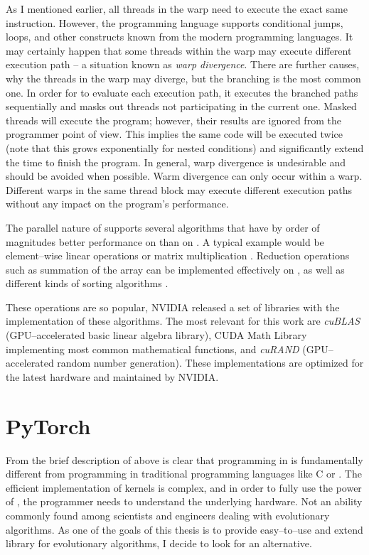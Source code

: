 As I mentioned earlier, all threads in the warp need to execute the exact same instruction. However, the programming language supports conditional jumps, loops, and other constructs known from the modern programming languages. It may certainly happen that some threads within the warp may execute different execution path -- a situation known as \emph{warp divergence}. There are further causes, why the threads in the warp may diverge, but the branching is the most common one. In order for \gpu to evaluate each execution path, it executes the branched paths sequentially and masks out threads not participating in the current one. Masked threads will execute the program; however, their results are ignored from the programmer point of view. This implies the same code will be executed twice (note that this grows exponentially for nested conditions) and significantly extend the time to finish the program. In general, warp divergence is undesirable and should be avoided when possible.
Warm divergence can only occur within a warp. Different warps in the same thread block may execute different execution paths without any impact on the program's performance.

The parallel nature of \cuda supports several algorithms that have by order of magnitudes better performance on \gpu than on \cpuns. A typical example would be element--wise linear operations or matrix multiplication \citep{GPUMatrixMultiplication}. Reduction operations such as summation of the array can be implemented effectively on \gpu \citep{harris2007optimizing}, as well as different kinds of sorting algorithms \citep{GPUsorting}.

These operations are so popular, NVIDIA released a set of libraries with the implementation of these algorithms. The most relevant for this work are \textit{cuBLAS} (GPU--accelerated basic linear algebra library), CUDA Math Library implementing most common mathematical functions, and \textit{cuRAND} (GPU--accelerated random number generation). These implementations are optimized for the latest hardware and maintained by NVIDIA.




\section{PyTorch}

From the brief description of \cuda above is clear that programming in \cuda is fundamentally different from programming in traditional programming languages like C or \cppns. The efficient implementation of kernels is complex, and in order to fully use the power of \gpuns, the programmer needs to understand the underlying hardware. Not an ability commonly found among scientists and engineers dealing with evolutionary algorithms. As one of the goals of this thesis is to provide easy--to--use and extend library for evolutionary algorithms, I decide to look for an alternative.

